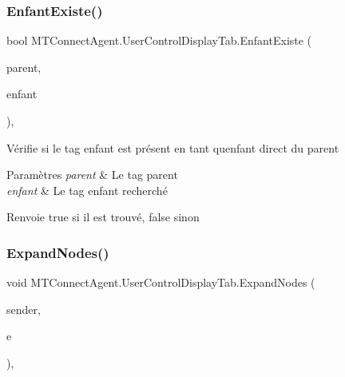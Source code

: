 \subsubsection{\texorpdfstring{Enfant\+Existe()}{EnfantExiste()}}
{\footnotesize\ttfamily bool M\+T\+Connect\+Agent.\+User\+Control\+Display\+Tab.\+Enfant\+Existe (\begin{DoxyParamCaption}\item[{\mbox{\hyperlink{class_m_t_connect_agent_1_1_model_1_1_tag}{Tag}}}]{parent,  }\item[{\mbox{\hyperlink{class_m_t_connect_agent_1_1_model_1_1_tag}{Tag}}}]{enfant }\end{DoxyParamCaption})\hspace{0.3cm}{\ttfamily [inline]}, {\ttfamily [private]}}



Vérifie si le tag enfant est présent en tant qu\textquotesingle{}enfant direct du parent 


\begin{DoxyParams}{Paramètres}
{\em parent} & Le tag parent\\
\hline
{\em enfant} & Le tag enfant recherché\\
\hline
\end{DoxyParams}
\begin{DoxyReturn}{Renvoie}
true si il est trouvé, false sinon
\end{DoxyReturn}
\mbox{\label{class_m_t_connect_agent_1_1_user_control_display_tab_a3b3bc198b2518ec65b3b2dba371d6f83}} 
\subsubsection{\texorpdfstring{Expand\+Nodes()}{ExpandNodes()}}
{\footnotesize\ttfamily void M\+T\+Connect\+Agent.\+User\+Control\+Display\+Tab.\+Expand\+Nodes (\begin{DoxyParamCaption}\item[{object}]{sender,  }\item[{Mouse\+Event\+Args}]{e }\end{DoxyParamCaption})\hspace{0.3cm}{\ttfamily [inline]}, {\ttfamily [private]}}



